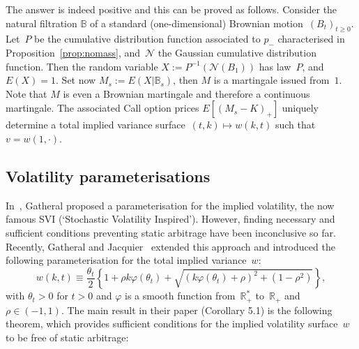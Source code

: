 \documentclass{amsart}[11pt]
\numberwithin{equation}{section}
\theoremstyle{definition}
\newcommand{\RR}{\mathbb{R}}
\newcommand{\Nn}{\mathcal{N}}
\begin{document}
The answer is indeed positive and this can be proved as follows.
Consider the natural filtration $\mathbb{B}$ of a standard (one-dimensional) 
Brownian motion~$(B_t)_{t\geq0}$. 
Let~$P$ be the cumulative distribution function associated to $p_-$ characterised in Proposition~\ref{prop:nomass}, 
and~$\Nn $ the Gaussian cumulative distribution function. 
Then the random variable $X := P^{-1}(\Nn (B_1))$ has law~$P$, and~$E(X)=1$. 
Set now $M_s := E(X|\mathbb{B}_s)$, then $M$ is a martingale issued from~$1$. 
Note that $M$ is even a Brownian martingale and therefore a continuous martingale. 
The associated Call option prices $E[(M_s -K)_+]$ uniquely determine a total implied variance surface~$(t,k)\mapsto w(k,t)$ 
such that $v=w(1,\cdot)$. 





\subsection{Volatility parameterisations}
In~\cite{Gatheral:2004}, Gatheral proposed a parameterisation for the implied volatility, the now famous SVI (`Stochastic Volatility Inspired').
However, finding necessary and sufficient conditions preventing static arbitrage have been inconclusive so far.
Recently, Gatheral and Jacquier~\cite{gj} extended this approach and introduced the following parameterisation for the total implied variance~$w$:
\begin{equation}\label{eq:SVIW}
w(k,t) \equiv \frac{\theta_t}{2}\left\{1+\rho k\varphi(\theta_t)+\sqrt{(k\varphi(\theta_t)+\rho)^2+(1-\rho^2)}\right\},
\end{equation}
with $\theta_t>0$ for $t>0$ and $\varphi$ is a smooth function from~$\RR_+^*$ to~$\RR_+$ 
and $\rho\in (-1,1)$.
The main result in their paper (Corollary 5.1) is the following theorem, 
which provides sufficient conditions for the implied volatility surface~$w$ to be free of static arbitrage:
\end{document}
